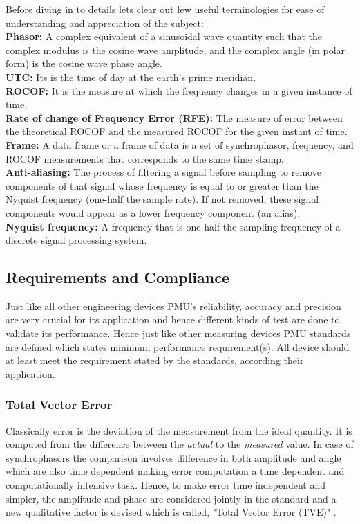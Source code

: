 Before diving in to details lets clear out few useful terminologies for ease of understanding and appreciation of the subject:\\
\textbf{Phasor:} A complex equivalent of a sinusoidal wave quantity such that the complex modulus is the cosine wave amplitude, and the complex angle (in polar form) is the cosine wave phase angle.\\
\textbf{UTC:} Its is the time of day at the earth's prime meridian.\\
\textbf{ROCOF:} It is the measure at which the frequency changes in a given instance of time.\\
\textbf{Rate of change of Frequency Error (RFE):} The measure of error between the theoretical ROCOF and the measured ROCOF for the given instant of time.\\
\textbf{Frame:} A data frame or a frame of data is a set of synchrophasor, frequency, and ROCOF measurements that corresponds to the same time stamp.\\
\textbf{Anti-aliasing:} The process of filtering a signal before sampling to remove components of that signal whose frequency is equal to or greater than the Nyquist frequency (one-half the sample rate). If not removed, these signal components would appear as a lower frequency component (an alias).\\
\textbf{Nyquist frequency:} A frequency that is one-half the sampling frequency of a discrete signal processing
system.\\

\subsection{Requirements and Compliance}
Just like all other engineering devices PMU's reliability, accuracy  and precision are very crucial for its application and hence different kinds of test are done to validate its performance. Hence just like other measuring devices PMU standards are defined which states minimum performance requirement(s). All device should at least meet the requirement stated by the standards, according their application.


\subsubsection{Total Vector Error}
Classically error is the deviation of the measurement from the ideal quantity. It is computed from the difference between the \textit{actual} to the \textit{measured} value. In case of synchrophasors the comparison involves difference in both amplitude and angle which are also time dependent making error computation a time dependent and computationally intensive task. Hence, to make error time independent and simpler, the amplitude and phase are considered jointly in the standard and a new qualitative factor is devised which is called, "Total Vector Error (TVE)" \cite{c37.118}.  
	

